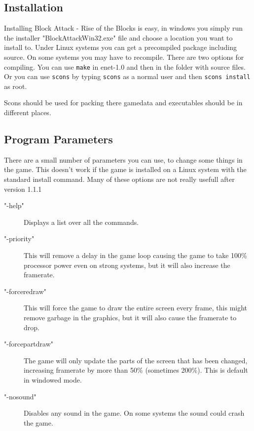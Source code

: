 \documentclass[11pt,a4paper]{article}
\begin{document}
\subsection{Installation}
Installing Block Attack - Rise of the Blocks is easy, in windows
you simply run the installer "BlockAttackWin32.exe" file and
choose a location you want to install to. Under Linux systems you
can get a precompiled package including source. On some systems
you may have to recompile. There are two options for compiling. You can use \verb+make+ in enet-1.0 and then in the folder with source files. Or you can use \verb+scons+ by typing \verb+scons+ as a normal user and then \verb+scons install+ as root. \newline 

Scons should be used for packing there gamedata and executables should be in different places. 
\subsection{Program Parameters}
There are a small number of parameters you can use, to change some
things in the game. This doesn't work if the game is installed on a Linux system with the standard install command. Many of these options are not really usefull after version 1.1.1
\begin{description}
\item["-help"] Displays a list over all the commands.
\item["-priority"] This will remove a delay in the game loop
causing the game to take 100\% processor power even on strong
systems, but it will also increase the framerate.
\item["-forceredraw"] This will force the game to draw the entire
screen every frame, this might remove garbage in the graphics, but
it will also cause the framerate to drop. \item["-forcepartdraw"]
The game will only update the parts of the screen that has been
changed, increasing framerate by more than 50\% (sometimes 200\%).
This is default in windowed mode.
\item["-nosound"] Disables any sound in the game. On some systems the sound could crash the game.
\end{description}
\end{document}
